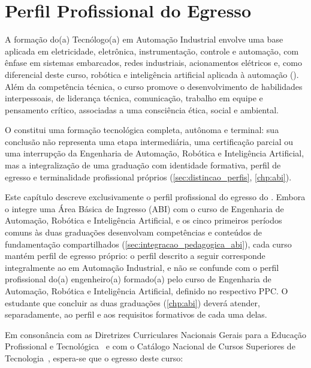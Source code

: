 \chapter{Perfil Profissional do Egresso}
\label{chp:perfil_egresso}

A formação do(a) Tecnólogo(a) em Automação Industrial envolve uma base aplicada em eletricidade, eletrônica, instrumentação, controle e automação, com ênfase em sistemas embarcados, redes industriais, acionamentos elétricos e, como diferencial deste curso, robótica e inteligência artificial aplicada à automação (\ppcenfasecurricular). Além da competência técnica, o curso promove o desenvolvimento de habilidades interpessoais, de liderança técnica, comunicação, trabalho em equipe e pensamento crítico, associadas a uma consciência ética, social e ambiental.

O \ppccurso constitui uma formação tecnológica completa, autônoma e terminal: sua conclusão não representa uma etapa intermediária, uma certificação parcial ou uma interrupção da Engenharia de Automação, Robótica e Inteligência Artificial, mas a integralização de uma graduação com identidade formativa, perfil de egresso e terminalidade profissional próprios (\autoref{sec:distincao_perfis}, \autoref{chp:abi}).

Este capítulo descreve exclusivamente o perfil profissional do egresso do \ppccurso. Embora o \ppccurso integre uma Área Básica de Ingresso (ABI) com o curso de Engenharia de Automação, Robótica e Inteligência Artificial, e os cinco primeiros períodos comuns às duas graduações desenvolvam competências e conteúdos de fundamentação compartilhados (\autoref{sec:integracao_pedagogica_abi}), cada curso mantém perfil de egresso próprio: o perfil descrito a seguir corresponde integralmente ao \ppcgrau em Automação Industrial, e não se confunde com o perfil profissional do(a) engenheiro(a) formado(a) pelo curso de Engenharia de Automação, Robótica e Inteligência Artificial, definido no respectivo PPC. O estudante que concluir as duas graduações (\autoref{chp:abi}) deverá atender, separadamente, ao perfil e aos requisitos formativos de cada uma delas.

Em consonância com as Diretrizes Curriculares Nacionais Gerais para a Educação Profissional e Tecnológica~\cite{cne_cp_1_2021} e com o Catálogo Nacional de Cursos Superiores de Tecnologia~\cite{mec_cncst_2024}, espera-se que o egresso deste curso:

